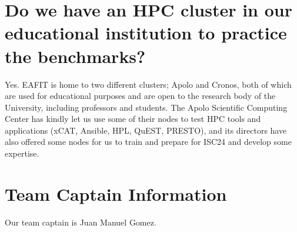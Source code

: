 \documentclass[11pt,a4paper,twocolumn]{article}
\begin{document}
\section{Do we have an HPC cluster in our educational institution to practice the benchmarks?}

Yes. EAFIT is home to two different clusters; Apolo and Cronos, both of which are used for educational purposes and are open to the research body of the University, including professors and students. The Apolo Scientific Computing Center has kindly let us use some of their nodes to test HPC tools and applications (xCAT, Ansible, HPL, QuEST, PRESTO), and its directors have also offered some nodes for us to train and prepare for ISC24 and develop some expertise.

\section{Team Captain Information}
Our team captain is Juan Manuel Gomez.
\end{document}
